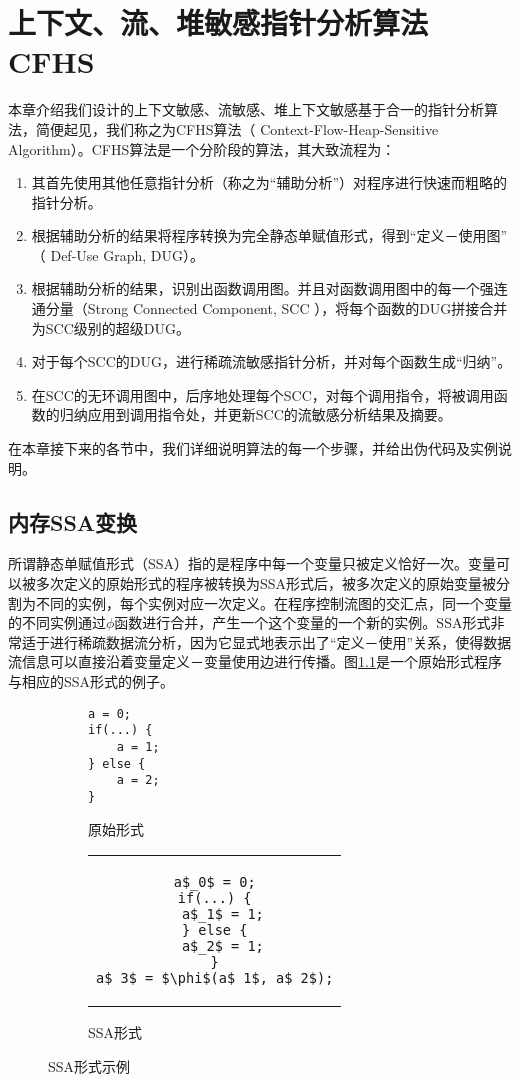\chapter{上下文、流、堆敏感指针分析算法CFHS}\label{algorithm}

本章介绍我们设计的上下文敏感、流敏感、堆上下文敏感基于合一的指针分析算法，简便起见，我们称之为CFHS算法（ Context-Flow-Heap-Sensitive Algorithm）。CFHS算法是一个分阶段的算法，其大致流程为：

\begin{enumerate}[topsep=1em, itemsep=1em]
\item 其首先使用其他任意指针分析（称之为“辅助分析”）对程序进行快速而粗略的指针分析。
\item 根据辅助分析的结果将程序转换为完全静态单赋值形式，得到“定义－使用图” （ Def-Use Graph, DUG）。
\item 根据辅助分析的结果，识别出函数调用图。并且对函数调用图中的每一个强连通分量（Strong Connected Component, SCC ），将每个函数的DUG拼接合并为SCC级别的超级DUG。
\item 对于每个SCC的DUG，进行稀疏流敏感指针分析，并对每个函数生成“归纳”。
\item 在SCC的无环调用图中，后序地处理每个SCC，对每个调用指令，将被调用函数的归纳应用到调用指令处，并更新SCC的流敏感分析结果及摘要。
\end{enumerate}

在本章接下来的各节中，我们详细说明算法的每一个步骤，并给出伪代码及实例说明。

\section{内存SSA变换}\label{sec:ssa}
所谓静态单赋值形式（SSA）\supercite{Cytron:1991}指的是程序中每一个变量只被定义恰好一次。变量可以被多次定义的原始形式的程序被转换为SSA形式后，被多次定义的原始变量被分割为不同的实例，每个实例对应一次定义。在程序控制流图的交汇点，同一个变量的不同实例通过$ \phi $函数进行合并，产生一个这个变量的一个新的实例。SSA形式非常适于进行稀疏数据流分析，因为它显式地表示出了“定义－使用”关系，使得数据流信息可以直接沿着变量定义－变量使用边进行传播\supercite{Reif:1977}。图\ref{code:ssa}是一个原始形式程序与相应的SSA形式的例子。

\begin{figure}[htbp]
\centering
\begin{subfigure}{0.5\linewidth}
\centering
\begin{BVerbatim}
a = 0;
if(...) {
    a = 1;
} else {
    a = 2;
}
\end{BVerbatim}
\caption{原始形式}
\end{subfigure}%
\begin{subfigure}{0.5\linewidth}
\centering
\begin{tabular}{c}
\begin{lstlisting}
a$_0$ = 0;
if(...) {
  a$_1$ = 1;
} else {
  a$_2$ = 1;
}
a$_3$ = $\phi$(a$_1$, a$_2$);
\end{lstlisting}
\end{tabular}
\caption{SSA形式}
\end{subfigure}
\caption{SSA形式示例}\label{code:ssa}
\end{figure}

